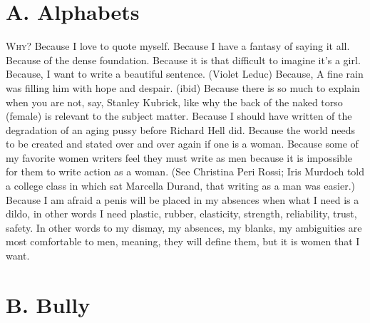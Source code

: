 \documentclass[
]{memoir}
\begin{document}
\hypertarget{a.-alphabets}{%
\section*{A. Alphabets}\label{a.-alphabets}}

\lettrine[lines=3, findent=0em, nindent=0.1em, lhang=0]{W}{hy?} Because
I love to quote myself. Because I have a fantasy of saying it all.
Because of the dense foundation. Because it is that difficult to imagine
it's a girl. Because, I want to write a beautiful sentence. (Violet
Leduc) Because, A fine rain was filling him with hope and despair.
(ibid) Because there is so much to explain when you are not, say,
Stanley Kubrick, like why the back of the naked torso (female) is
relevant to the subject matter. Because I should have written of the
degradation of an aging pussy before Richard Hell did. Because the world
needs to be created and stated over and over again if one is a woman.
Because some of my favorite women writers feel they must write as men
because it is impossible for them to write action as a woman. (See
Christina Peri Rossi; Iris Murdoch told a college class in which sat
Marcella Durand, that writing as a man was easier.) Because I am afraid
a penis will be placed in my absences when what I need is a dildo, in
other words I need plastic, rubber, elasticity, strength, reliability,
trust, safety. In other words to my dismay, my absences, my blanks, my
ambiguities are most comfortable to men, meaning, they will define them,
but it is women that I want.

\hypertarget{b.-bully}{%
\section*{B. Bully}\label{b.-bully}}
\end{document}
